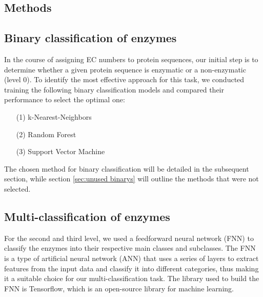 \documentclass{bioinfo}
\begin{document}
\begin{methods}
\section{Methods}
\subsection{Binary classification of enzymes}
In the course of assigning EC numbers to protein sequences,
our initial step is to determine whether a given protein sequence is enzymatic or a non-enzymatic (level 0).
To identify the most effective approach for this task,
we conducted training the following binary classification models and compared their performance to select the optimal one:
\begin{enumerate}
	\item[(1)] k-Nearest-Neighbors
	\item[(2)] Random Forest 
	\item[(3)] Support Vector Machine
\end{enumerate}

The chosen method for binary classification will be detailed in the subsequent section, while section \ref{sec:unused binarys} will outline the methods that were not selected.


\subsection{Multi-classification of enzymes}
For the second and third level, we used a feedforward neural network (FNN) to classify the enzymes into their respective main classes and subclasses.
The FNN is a type of artificial neural network (ANN) that uses a series of layers to extract features from the input data and classify it into different categories,
thus making it a suitable choice for our multi-classification task. The library used to build the FNN is Tensorflow, which is an open-source library for machine learning.


\end{methods}
\end{document}
